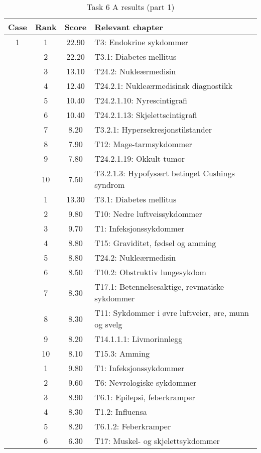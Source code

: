 \begin{table}[htbp] \footnotesize \center
\caption{Task 6 A results (part 1)\label{tab:task6a1}}
\begin{tabular}{c c c l}
    \toprule
    Case & Rank & Score & Relevant chapter \\
    \midrule
    1 & 1 & 22.90 & T3: Endokrine sykdommer \\
     & 2 & 22.20 & T3.1: Diabetes mellitus \\
     & 3 & 13.10 & T24.2: Nukleærmedisin \\
     & 4 & 12.40 & T24.2.1: Nukleærmedisinsk diagnostikk \\
     & 5 & 10.40 & T24.2.1.10: Nyrescintigrafi \\
     & 6 & 10.40 & T24.2.1.13: Skjelettscintigrafi \\
     & 7 & 8.20 & T3.2.1: Hypersekresjonstilstander \\
     & 8 & 7.90 & T12: Mage-tarmsykdommer \\
     & 9 & 7.80 & T24.2.1.19: Okkult tumor \\
     & 10 & 7.50 & T3.2.1.3: Hypofysært betinget Cushings syndrom \\
	\addlinespace
    2 & 1 & 13.30 & T3.1: Diabetes mellitus \\
     & 2 & 9.80 & T10: Nedre luftveissykdommer \\
     & 3 & 9.70 & T1: Infeksjonssykdommer \\
     & 4 & 8.80 & T15: Graviditet, fødsel og amming \\
     & 5 & 8.80 & T24.2: Nukleærmedisin \\
     & 6 & 8.50 & T10.2: Obstruktiv lungesykdom \\
     & 7 & 8.30 & T17.1: Betennelsesaktige, revmatiske sykdommer \\
     & 8 & 8.30 & T11: Sykdommer i øvre luftveier, øre, munn og svelg \\
     & 9 & 8.20 & T14.1.1.1: Livmorinnlegg \\
     & 10 & 8.10 & T15.3: Amming \\
	\addlinespace
    3 & 1 & 9.80 & T1: Infeksjonssykdommer \\
     & 2 & 9.60 & T6: Nevrologiske sykdommer \\
     & 3 & 8.90 & T6.1: Epilepsi, feberkramper \\
     & 4 & 8.30 & T1.2: Influensa \\
     & 5 & 8.20 & T6.1.2: Feberkramper \\
     & 6 & 6.30 & T17: Muskel- og skjelettsykdommer \\

\end{tabular}
\end{table}
